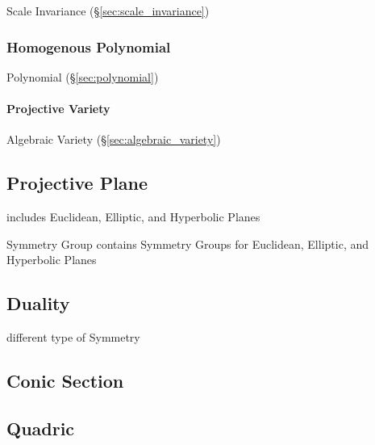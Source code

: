 Scale Invariance (\S\ref{sec:scale_invariance})



\subsubsection{Homogenous Polynomial}\label{sec:homogenous_polynomial}

Polynomial (\S\ref{sec:polynomial})



\paragraph{Projective Variety}\label{sec:projective_variety}\hfill

Algebraic Variety (\S\ref{sec:algebraic_variety})



\subsection{Projective Plane}\label{sec:projective_plane}

includes Euclidean, Elliptic, and Hyperbolic Planes

Symmetry Group contains Symmetry Groups for Euclidean, Elliptic, and
Hyperbolic Planes



\subsection{Duality}\label{sec:projective_duality}

different type of Symmetry %



\subsection{Conic Section}\label{sec:conic_section}

\subsection{Quadric}\label{sec:quadric}

